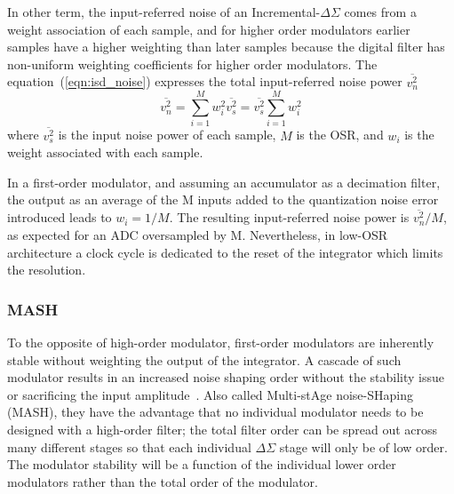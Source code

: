 
In other term, the input-referred noise of an Incremental-\(\Delta\Sigma \) comes from a weight association of each sample, and for higher order modulators earlier samples have a higher weighting than later samples because the digital filter has non-uniform weighting coefficients for higher order modulators. The equation~(\ref{eqn:isd_noise}) expresses the total input-referred noise power \(\overline{v_{n}^{2}}\)
\begin{equation}
	\overline{v_{n}^{2}}=\sum_{i=1}^{M}w_{i}^{2}\overline{v_{s}^{2}}=\overline{v_{s}^{2}}\sum_{i=1}^{M}w_{i}^{2}
\label{eqn:isd_noise}
\end{equation}
where \(\overline{v_{s}^{2}}\) is the input noise power of each sample, \(M\) is the OSR, and \(w_i\) is the weight associated with each sample.

In a first-order modulator, and assuming an accumulator as a decimation filter, the output as an average of the M inputs added to the quantization noise error introduced leads to \(w_i=1/M\). The resulting input-referred noise power is \(\overline{v_{n}^{2}}/M\), as expected for an ADC oversampled by M. Nevertheless, in low-OSR architecture a clock cycle is dedicated to the reset of the integrator which limits the resolution.

\subsubsection{MASH}
To the opposite of high-order modulator, first-order modulators are inherently stable without weighting the output of the integrator. A cascade of such modulator results in an increased noise shaping order without the stability issue or sacrificing the input amplitude~\cite{Brooks1997}. Also called Multi-stAge noise-SHaping (MASH), they have the advantage that no individual modulator needs to be designed with a high-order filter; the total filter order can be spread out across many different stages so that each individual \(\Delta\Sigma \) stage will only be of low order. The modulator stability will be a function of the individual lower order modulators rather than the total order of the modulator.

